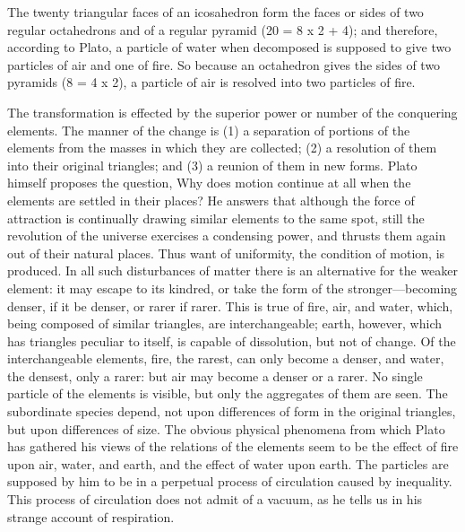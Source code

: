 \documentclass[11pt,letter]{article}
\begin{document}
\par  The twenty triangular faces of an icosahedron form the faces or sides of two regular octahedrons and of a regular pyramid (20 = 8 x 2 + 4); and therefore, according to Plato, a particle of water when decomposed is supposed to give two particles of air and one of fire. So because an octahedron gives the sides of two pyramids (8 = 4 x 2), a particle of air is resolved into two particles of fire.

\par  The transformation is effected by the superior power or number of the conquering elements. The manner of the change is (1) a separation of portions of the elements from the masses in which they are collected; (2) a resolution of them into their original triangles; and (3) a reunion of them in new forms. Plato himself proposes the question, Why does motion continue at all when the elements are settled in their places? He answers that although the force of attraction is continually drawing similar elements to the same spot, still the revolution of the universe exercises a condensing power, and thrusts them again out of their natural places. Thus want of uniformity, the condition of motion, is produced. In all such disturbances of matter there is an alternative for the weaker element: it may escape to its kindred, or take the form of the stronger—becoming denser, if it be denser, or rarer if rarer. This is true of fire, air, and water, which, being composed of similar triangles, are interchangeable; earth, however, which has triangles peculiar to itself, is capable of dissolution, but not of change. Of the interchangeable elements, fire, the rarest, can only become a denser, and water, the densest, only a rarer: but air may become a denser or a rarer. No single particle of the elements is visible, but only the aggregates of them are seen. The subordinate species depend, not upon differences of form in the original triangles, but upon differences of size. The obvious physical phenomena from which Plato has gathered his views of the relations of the elements seem to be the effect of fire upon air, water, and earth, and the effect of water upon earth. The particles are supposed by him to be in a perpetual process of circulation caused by inequality. This process of circulation does not admit of a vacuum, as he tells us in his strange account of respiration.
\end{document}
